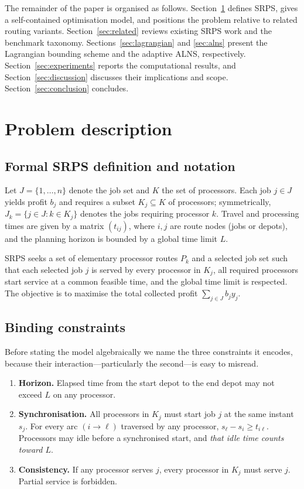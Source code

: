 \documentclass[preprint,12pt]{elsarticle}
\begin{document}
The remainder of the paper is organised as follows. Section~\ref{sec:problem} defines SRPS, gives a self-contained optimisation model, and positions the problem relative to related routing variants. Section~\ref{sec:related} reviews existing SRPS work and the benchmark taxonomy. Sections~\ref{sec:lagrangian} and \ref{sec:alns} present the Lagrangian bounding scheme and the adaptive ALNS, respectively. Section~\ref{sec:experiments} reports the computational results, and Section~\ref{sec:discussion} discusses their implications and scope. Section~\ref{sec:conclusion} concludes.

\section{Problem description}\label{sec:problem}

\subsection{Formal SRPS definition and notation}

Let $J=\{1,\dots,n\}$ denote the job set and $K$ the set of processors. Each job $j\in J$ yields profit $b_j$ and requires a subset $K_j\subseteq K$ of processors; symmetrically, $J_k=\{j\in J:k\in K_j\}$ denotes the jobs requiring processor $k$. Travel and processing times are given by a matrix $(t_{ij})$, where $i,j$ are route nodes (jobs or depots), and the planning horizon is bounded by a global time limit $L$.

SRPS seeks a set of elementary processor routes $P_k$ and a selected job set such that each selected job $j$ is served by every processor in $K_j$, all required processors start service at a common feasible time, and the global time limit is respected. The objective is to maximise the total collected profit $\sum_{j\in J} b_j y_j$.

\subsection{Binding constraints}

Before stating the model algebraically we name the three constraints it encodes,
because their interaction---particularly the second---is easy to misread.

\begin{enumerate}
  \item \textbf{Horizon.} Elapsed time from the start depot to the end depot may
    not exceed $L$ on any processor.
  \item \textbf{Synchronisation.} All processors in $K_j$ must start job $j$ at
    the same instant $s_j$. For every arc $(i\to \ell)$ traversed by any
    processor, $s_\ell-s_i\ge t_{i\ell}$. Processors may idle before a
    synchronised start, and \emph{that idle time counts toward $L$}.
  \item \textbf{Consistency.} If any processor serves $j$, every processor in
    $K_j$ must serve $j$. Partial service is forbidden.
\end{enumerate}
\end{document}
